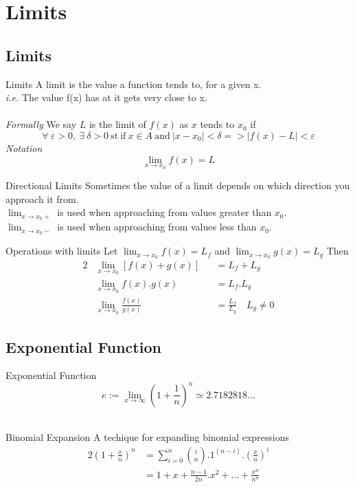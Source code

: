 \documentclass[11pt,a4paper]{article}
\begin{document}
\section{Limits}
\subsection{Limits}
\subtitle{Definition 2.01 - }{Limits}
A limit is the value a function tends to, for a given x. \\
\textit{i.e.} The value f(x) has at it gets very close to x. \\
\\\textit{Formally} We say $L$ is the limit of $f(x)$ as $x$ tends to $x_0$ if $$\forall\ \varepsilon > 0,\ \exists\ \delta > 0\ \mathrm{st\ if}\ x \in A\ \mathrm{and}\ |x - x_0| < \delta => |f(x) - L| < \varepsilon$$
\textit{Notation} $$\lim_{x \to x_0} f(x) = L$$

\newpage
\subtitle{Definition 2.02 - }{Directional Limits}
Sometimes the value of a limit depends on which direction you approach it from.\\
$\lim_{x \to x_{0}+}$ is used when approaching from values greater than $x_0$. \\
$\lim_{x \to x_{0}-}$ is used when approaching from values less than $x_0$. \\

\subtitle{Theorem 2.03 - }{Operations with limits}
Let $\lim_{x \to x_0} f(x) = L_f$ and $\lim_{x \to x_0} g(x) = L_g$
Then
\begin{alignat*}{2}
  &\lim_{x \to x_0} \left[f(x) + g(x)\right] &&= L_f + L_g \\
  &\lim_{x \to x_0} f(x).g(x) &&= L_f.L_g \\
  &\lim_{x \to x_0} \frac{f(x)}{g(x)} &&= \frac{L_f}{L_g} \quad L_g \not = 0
\end{alignat*}

\subsection{Exponential Function}
\subtitle{Definition 2.04 - }{Exponential Function}
$$e := \lim_{x \to \infty} \left(1+\frac{1}{n}\right)^n \simeq 2.7182818...$$\\

\subtitle{Theorem 2.05 - }{Binomial Expansion}
A techique for expanding binomial expressions
\begin{alignat*}{2}
\left(1+\frac{x}{n}\right)^n &= \sum_{i=0}^{n} \binom{i}{n} . 1^{(n-i)} . \left(\frac{x}{n}\right)^i \\
&= 1 + x + \frac{n-1}{2n}.x^2 + ... + \frac{x^n}{n^n}
\end{alignat*}
\end{document}

